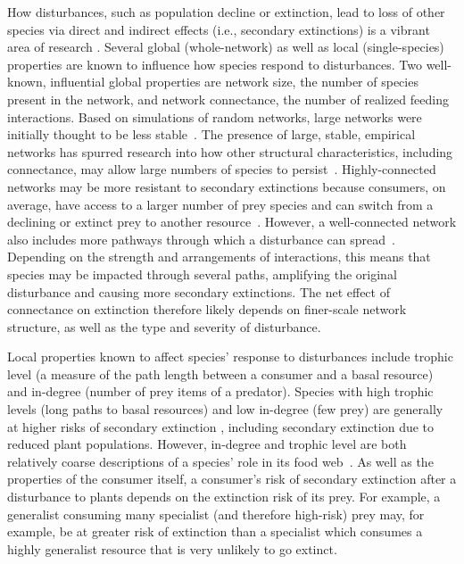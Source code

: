 \documentclass[12pt]{article}
\begin{document}
\begin{spacing}{2.0}
    How disturbances, such as population decline or extinction, lead to loss of other species via direct and indirect effects (i.e., secondary extinctions) is a vibrant area of research \citep{Santos2021,curtsdotter2011robustness, dunne2009cascading, Eklof2006}.
    Several global (whole-network) as well as local (single-species) properties are known to influence how species respond to disturbances. Two well-known, influential global properties are network size, the number of species present in the network, and network connectance, the number of realized feeding interactions.
    Based on simulations of random networks, large networks were initially thought to be less stable~\citep{May1972}.
    The presence of large, stable, empirical networks has spurred research into how other structural characteristics, including connectance, may allow large numbers of species to persist~\citep{Dunne2002}.
    Highly-connected networks may be more resistant to secondary extinctions because consumers, on average, have access to a larger number of prey species and can switch from a declining or extinct prey to another resource~\citep{Dunne2002, Eklof2006,Baumgartner2020}. However, a well-connected network also includes more pathways through which a disturbance can spread~\citep{Vieira2015}.
    Depending on the strength and arrangements of interactions, this means that species may be impacted through several paths, amplifying the original disturbance and causing more secondary extinctions.
    The net effect of connectance on extinction therefore likely depends on finer-scale network structure, as well as the type and severity of disturbance.
    
    
    Local properties known to affect species' response to disturbances include trophic level (a measure of the path length between a consumer and a basal resource) and in-degree (number of prey items of a predator). 
    Species with high trophic levels (long paths to basal resources) and low in-degree (few prey) are generally at higher risks of secondary extinction \citep{binzer2011susceptibility, Eklof2006}, including secondary extinction due to reduced plant populations.
    However, in-degree and trophic level are both relatively coarse descriptions of a species' role in its food web~\citep{Cirtwill2018FoodWebs}. 
    As well as the properties of the consumer itself, a consumer's risk of secondary extinction after a disturbance to plants depends on the extinction risk of its prey.
    For example, a generalist consuming many specialist (and therefore high-risk) prey may, for example, be at greater risk of extinction than a specialist which consumes a highly generalist resource that is very unlikely to go extinct. 



\end{spacing}
\end{document}
